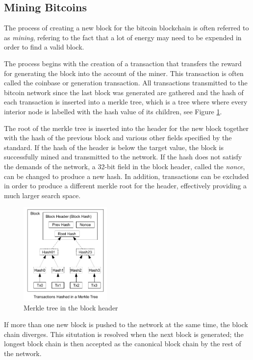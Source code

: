 \subsection{Mining Bitcoins}
\label{sec:bitcoin-mining}

The process of creating a new block for the bitcoin blockchain is often referred to as \textit{mining},
refering to the fact that a lot of energy may need to be expended in order to find a valid block.

The process begins with the creation of a transaction that transfers the reward for generating the block
into the account of the miner. This transaction is often called the coinbase or generation transaction.
All transactions transmitted to the bitcoin network since the last block was generated are gathered and
the hash of each transaction is inserted into a merkle tree, which is a tree where where every interior
node is labelled with the hash value of its children, see Figure \ref{fig:merkle}.

The root of the merkle tree is inserted into the header for the new block together with the hash of the
previous block and various other fields specified by the standard. If the hash of the header is below the
target value, the block is successfully mined and transmitted to the network. If the hash does not satisfy
the demands of the network, a 32-bit field in the block header, called the \textit{nonce}, can be changed
to produce a new hash. In addition, transactions can be excluded in order to produce a different merkle
root for the header, effectively providing a much larger search space.

\begin{figure}
	\centering
	\includegraphics[width=0.4\textwidth]{Figures/Bitcoin/Merkle-tree.png}
	\caption{Merkle tree in the block header \cite{bitcoin}}
	\label{fig:merkle}
\end{figure}

If more than one new block is pushed to the network at the same time, the block chain diverges.
This situtation is resolved when the next block is generated; the longest block chain is then accepted
as the canonical block chain by the rest of the network. \cite{bitcoin}

